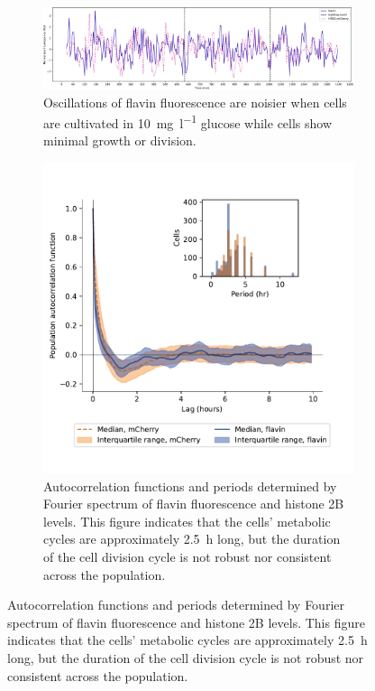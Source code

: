 \begin{figure}
  \centering
  \begin{subfigure}[htpb]{1.0\textwidth}
   \centering
   \includegraphics[width=\textwidth]{limiting_single_birth_plot_edit.pdf}
   \caption{
     Oscillations of flavin fluorescence are noisier when cells are cultivated in \SI{10}{\milli\gram~\litre^{-1}} glucose while cells show minimal growth or division.
   }
   \label{fig:biology-lowglc-single}
  \end{subfigure}

  \begin{subfigure}[htpb]{0.7\textwidth}
   \centering
   \includegraphics[width=\textwidth]{htb2mCherry_31492_12.pdf}
   \caption{
     Autocorrelation functions and periods determined by Fourier spectrum of flavin fluorescence and histone 2B levels.
     This figure indicates that the cells' metabolic cycles are approximately \SI{2.5}{\hour} long, but the duration of the cell division cycle is not robust nor consistent across the population.
   }
   \label{fig:biology-lowglc-acf}
  \end{subfigure}


\end{figure}
